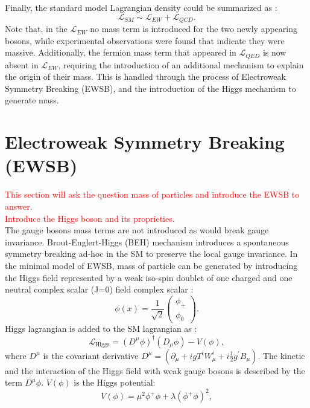 Finally, the standard model Lagrangian density could be summarized as : 
\begin{equation}
    \mathcal{L}_{SM} \sim \mathcal{L}_{EW} + \mathcal{L}_{QCD}.
\end{equation}
Note that, in the $\mathcal{L}_{EW}$ no mass term is introduced for the two newly appearing bosons, while experimental observations were found that indicate they were massive. Additionally, the fermion mass term that appeared in $\mathcal{L}_{QED}$ is now absent in $\mathcal{L}_{EW}$, requiring the introduction of an additional mechanism to explain the origin of their mass. This is handled through the process of Electroweak Symmetry Breaking (EWSB), and the introduction of the Higgs mechanism to generate mass.

\section{Electroweak Symmetry Breaking (EWSB)}
\label{chap1:EWSB}
\textcolor{red}{This section will ask the question mass of particles and introduce the EWSB to answer.\\
Introduce the Higgs boson and its proprieties.\\
}
The gauge bosons mass terms are not introduced as would break gauge invariance. Brout-Englert-Higgs (BEH) mechanism introduces a spontaneous symmetry breaking ad-hoc in the SM to preserve the local gauge invariance. In the minimal model of EWSB, mass of particle can be generated by introducing the Higgs field represented by a weak iso-spin doublet of one charged and one neutral complex scalar (J=0) field complex scalar :
\begin{equation}
    \phi(x)=\frac{1}{\sqrt{2}}\left(\begin{array}{c}
\phi_{+} \\
\phi_{0}
\end{array}\right).
\end{equation}
Higgs lagrangian is added to the SM lagrangian as :
\begin{equation}
    \mathcal{L}_{\mathrm{Higgs}}=\left(D^{\mu} \phi\right)^{\dagger}\left(D_{\mu} \phi\right)-V(\phi),
\end{equation}
where $D^\mu$ is the covariant derivative $D^\mu =\left(\partial_{\mu}+i g T^{i} W_{\mu}^{i}+i \frac{1}{2} g^{\prime} B_{\mu}\right)$. The kinetic and the interaction of the Higgs field with weak gauge bosons is described by the term $D^\mu\phi$. $V(\phi)$ is the Higgs potential:
\begin{equation}
    V(\phi)=\mu^{2} \phi^{+} \phi+\lambda\left(\phi^{+} \phi\right)^{2},
\end{equation}
